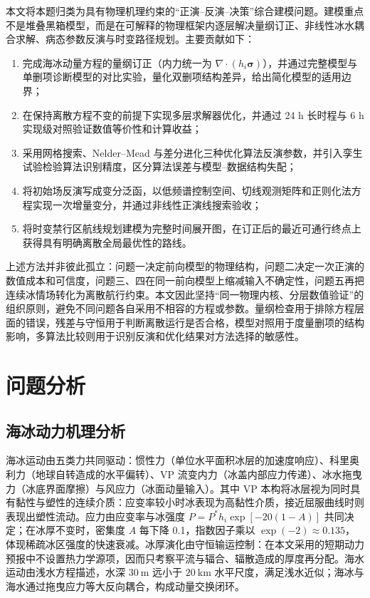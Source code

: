 \documentclass[UTF8,fontset=none]{ctexart}
\newcommand{\vect}[1]{\boldsymbol{#1}}
\begin{document}
本文将本题归类为具有物理机理约束的“正演--反演--决策”综合建模问题。建模重点不是堆叠黑箱模型，而是在可解释的物理框架内逐层解决量纲订正、非线性冰水耦合求解、病态参数反演与时变路径规划。主要贡献如下：

\begin{enumerate}
\item 完成海冰动量方程的量纲订正（内力统一为 $\nabla\cdot(h_i\vect\sigma)$），并通过完整模型与单删项诊断模型的对比实验，量化双删项结构差异，给出简化模型的适用边界；
\item 在保持离散方程不变的前提下实现多层求解器优化，并通过 24 h 长时程与 6 h 实现级对照验证数值等价性和计算收益；
\item 采用网格搜索、Nelder--Mead 与差分进化三种优化算法反演参数，并引入孪生试验检验算法识别精度，区分算法误差与模型--数据结构失配；
\item 将初始场反演写成变分泛函，以低频谱控制空间、切线观测矩阵和正则化法方程实现一次增量变分，并通过非线性正演线搜索验收；
\item 将时变禁行区航线规划建模为完整时间展开图，在订正后的最近可通行终点上获得具有明确离散全局最优性的路线。
\end{enumerate}

上述方法并非彼此孤立：问题一决定前向模型的物理结构，问题二决定一次正演的数值成本和可信度，问题三、四在同一前向模型上缩减输入不确定性，问题五再把连续冰情场转化为离散航行约束。本文因此坚持“同一物理内核、分层数值验证”的组织原则，避免不同问题各自采用不相容的方程或参数。量纲检查用于排除方程层面的错误，残差与守恒用于判断离散运行是否合格，模型对照用于度量删项的结构影响，多算法比较则用于识别反演和优化结果对方法选择的敏感性。

\section{问题分析}

\subsection{海冰动力机理分析}

海冰运动由五类力共同驱动：惯性力（单位水平面积冰层的加速度响应）、科里奥利力（地球自转造成的水平偏转）、VP 流变内力（冰盖内部应力传递）、冰水拖曳力（冰底界面摩擦）与风应力（冰面动量输入）。其中 VP 本构将冰层视为同时具有黏性与塑性的连续介质\cite{hibler1979,feltham2008}：应变率较小时冰表现为高黏性介质，接近屈服曲线时则表现出塑性流动。应力由应变率与冰强度 $P=P^*h_i\exp[-20(1-A)]$ 共同决定；在冰厚不变时，密集度 $A$ 每下降 0.1，指数因子乘以 $\exp(-2)\approx0.135$，体现稀疏冰区强度的快速衰减。冰厚演化由守恒输运控制：在本文采用的短期动力预报中不设置热力学源项，因而只考察平流与辐合、辐散造成的厚度再分配。海水运动由浅水方程描述，水深 $30\ \mathrm m$ 远小于 $20\ \mathrm{km}$ 水平尺度，满足浅水近似；海冰与海水通过拖曳应力等大反向耦合，构成动量交换闭环。
\end{document}
